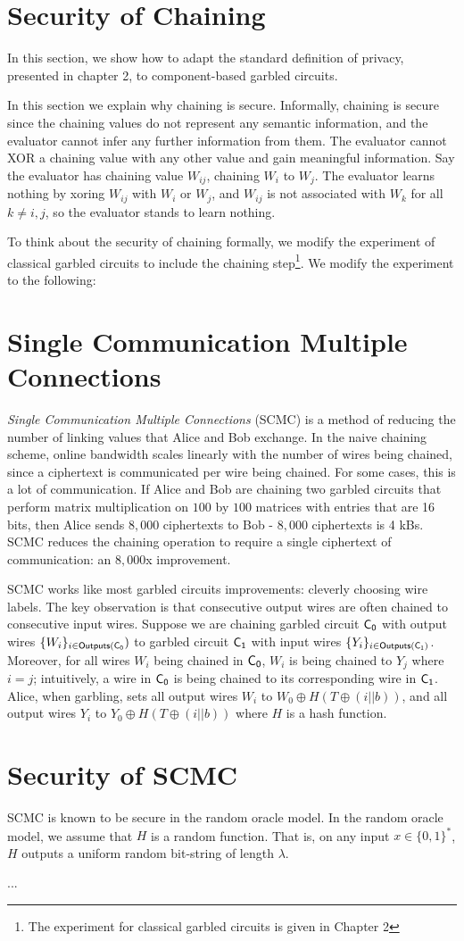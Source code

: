 \section{Security of Chaining}

In this section, we show how to adapt the standard definition of privacy, presented in chapter 2, to component-based garbled circuits.

In this section we explain why chaining is secure.
Informally, chaining is secure since the chaining values do not represent any semantic information, and the evaluator cannot infer any further information from them.
The evaluator cannot XOR a chaining value with any other value and gain meaningful information.
Say the evaluator has chaining value $W_{ij}$, chaining $W_i$ to $W_j$. 
The evaluator learns nothing by xoring $W_{ij}$ with $W_i$ or $W_j$, and $W_{ij}$ is not associated with $W_k$ for all $k \neq i,j$, so the evaluator stands to learn nothing.

To think about the security of chaining formally, we modify the experiment of classical garbled circuits to include the chaining step\footnote{The experiment for classical garbled circuits is given in Chapter 2}.
We modify the experiment to the following:


\section{Single Communication Multiple Connections}
\textit{Single Communication Multiple Connections} (SCMC) is a method of reducing the number of linking values that Alice and Bob exchange.
In the naive chaining scheme, online bandwidth scales linearly with the number of wires being chained, since a ciphertext is communicated per wire being chained.
For some cases, this is a lot of communication.
If Alice and Bob are chaining two garbled circuits that perform matrix multiplication on $100$ by $100$ matrices with entries that are 16 bits, then Alice sends $8,000$ ciphertexts to Bob - $8,000$ ciphertexts is 4 kBs.
SCMC reduces the chaining operation to require a single ciphertext of communication: an $8,000$x improvement.

SCMC works like most garbled circuits improvements: cleverly choosing wire labels.
The key observation is that consecutive output wires are often chained to consecutive input wires.
Suppose we are chaining garbled circuit $\sf {C}_0$ with output wires $\{W_i\}_{i \in {\sf {Outputs}}(\sf {C}_0})$ to garbled circuit $\sf {C}_1$ with input wires $\{Y_i\}_{i \in {\sf {Outputs}}(\sf {C}_1)}$.
Moreover, for all wires $W_i$ being chained in $\sf {C}_0$, $W_i$ is being chained to $Y_j$ where $i = j$; intuitively, a wire in $\sf {C}_0$ is being chained to its corresponding wire in $\sf {C}_1$.
Alice, when garbling, sets all output wires $W_i$ to $W_0 \oplus H(T \oplus (i || b))$, and all output wires $Y_i$ to $Y_0 \oplus H(T \oplus (i || b))$ where $H$ is a hash function.

\section{Security of SCMC}
SCMC is known to be secure in the random oracle model.
In the random oracle model, we assume that $H$ is a random function.
That is, on any input $x \in \{0,1\}^*$, $H$ outputs a uniform random bit-string of length $\lambda$.

...

